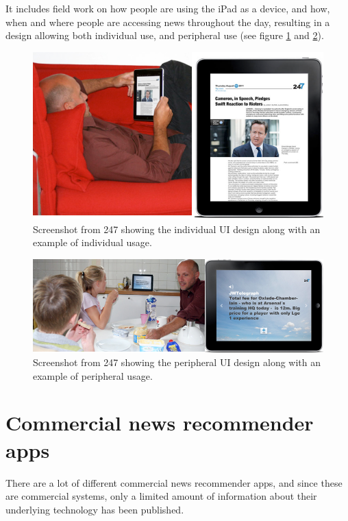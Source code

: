 It includes field work on how people are using the iPad as a device, and how, when and where people are accessing news throughout the day, resulting in a design allowing both individual use, and peripheral use (see figure \ref{future_of_news_individual_use} and \ref{future_of_news_peripheral_use}).

\begin{figure}[!htbp]
\centering
\includegraphics[width=120mm]{GFX/screenshots/futureOfNewsPaperIndividualUse.png}
\caption{Screenshot from 247 showing the individual UI design along with an example of individual usage.}
\label{future_of_news_individual_use}
\end{figure}

\begin{figure}[!htbp]
\centering
\includegraphics[width=120mm]{GFX/screenshots/futureOfNewsPaperPeripheralUse.png}
\caption{Screenshot from 247 showing the peripheral UI design along with an example of peripheral usage.}
\label{future_of_news_peripheral_use}
\end{figure}

\section{Commercial news recommender apps}
There are a lot of different commercial news recommender apps, and since these are commercial systems, only a limited amount of information about their underlying technology has been published.

